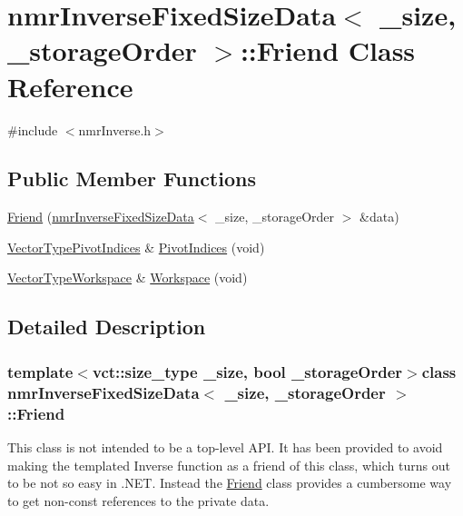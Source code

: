 \hypertarget{classnmr_inverse_fixed_size_data_1_1_friend}{}\section{nmr\+Inverse\+Fixed\+Size\+Data$<$ \+\_\+size, \+\_\+storage\+Order $>$\+:\+:Friend Class Reference}
\label{classnmr_inverse_fixed_size_data_1_1_friend}


{\ttfamily \#include $<$nmr\+Inverse.\+h$>$}

\subsection*{Public Member Functions}
\begin{DoxyCompactItemize}
\item 
\hyperlink{classnmr_inverse_fixed_size_data_1_1_friend_ae97c8f22cce521942059d09800dafbeb}{Friend} (\hyperlink{classnmr_inverse_fixed_size_data}{nmr\+Inverse\+Fixed\+Size\+Data}$<$ \+\_\+size, \+\_\+storage\+Order $>$ \&data)
\item 
\hyperlink{classnmr_inverse_fixed_size_data_ac8e0c496927d3fe726116c4c6ddf5af2}{Vector\+Type\+Pivot\+Indices} \& \hyperlink{classnmr_inverse_fixed_size_data_1_1_friend_afbd211ddea09f59365e7498486cb59e5}{Pivot\+Indices} (void)
\item 
\hyperlink{classnmr_inverse_fixed_size_data_ac3e08c421f20d9f34917b2cdc03f3b34}{Vector\+Type\+Workspace} \& \hyperlink{classnmr_inverse_fixed_size_data_1_1_friend_a2aec57717e533b52b4cfeddfb5a1d2aa}{Workspace} (void)
\end{DoxyCompactItemize}


\subsection{Detailed Description}
\subsubsection*{template$<$vct\+::size\+\_\+type \+\_\+size, bool \+\_\+storage\+Order$>$class nmr\+Inverse\+Fixed\+Size\+Data$<$ \+\_\+size, \+\_\+storage\+Order $>$\+::\+Friend}

This class is not intended to be a top-\/level A\+P\+I. It has been provided to avoid making the templated Inverse function as a friend of this class, which turns out to be not so easy in .N\+E\+T. Instead the \hyperlink{classnmr_inverse_fixed_size_data_1_1_friend}{Friend} class provides a cumbersome way to get non-\/const references to the private data. 

